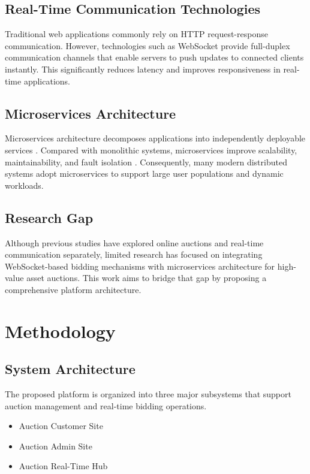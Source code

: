 \documentclass[runningheads]{llncs}
\begin{document}
\subsection{Real-Time Communication Technologies}

Traditional web applications commonly rely on HTTP request-response communication. However, technologies such as WebSocket provide full-duplex communication channels that enable servers to push updates to connected clients instantly\cite{websocket}. This significantly reduces latency and improves responsiveness in real-time applications.

\subsection{Microservices Architecture}

Microservices architecture decomposes applications into independently deployable services \cite{microservice}. Compared with monolithic systems, microservices improve scalability, maintainability, and fault isolation \cite{newman2021}. Consequently, many modern distributed systems adopt microservices to support large user populations and dynamic workloads.

\subsection{Research Gap}

Although previous studies have explored online auctions and real-time communication separately, limited research has focused on integrating WebSocket-based bidding mechanisms with microservices architecture for high-value asset auctions. This work aims to bridge that gap by proposing a comprehensive platform architecture.

\section{Methodology}

\subsection{System Architecture}

The proposed platform is organized into three major subsystems that support auction management and real-time bidding operations.

\begin{itemize}
\item Auction Customer Site
\item Auction Admin Site
\item Auction Real-Time Hub
\end{itemize}
\end{document}
